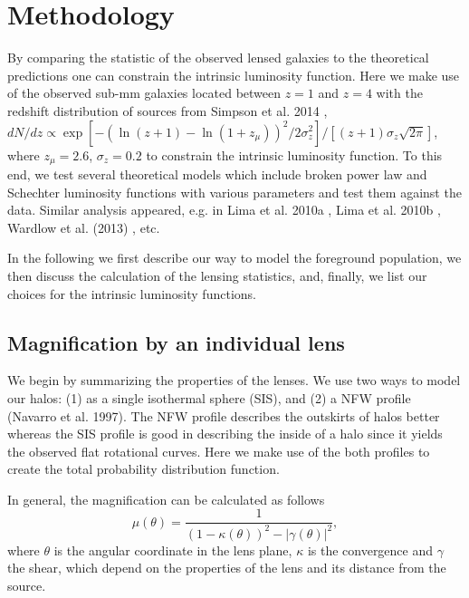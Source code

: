 \documentclass[12pt]{article}
\begin{document}
 
\section{Methodology}
By comparing the statistic of the observed lensed galaxies to the theoretical
predictions one can constrain the intrinsic luminosity function. Here we make
use of the observed sub-mm galaxies  located between $z = 1$ and $z = 4$ with
the  redshift distribution of sources from Simpson et al. 2014 \cite{Simpson:2014lr}, $
dN/dz \propto \exp\left[-(\ln(z+1)-\ln(1+z_\mu))^2/2\sigma_z^2\right]/\left[(z+1)\sigma_z\sqrt{2\pi}\right]$, where $z_\mu = 2.6$, $\sigma_z = 0.2$ to constrain the intrinsic luminosity function. To this end, we test several theoretical models which include broken power law and Schechter luminosity functions with various parameters and test them against the data. Similar analysis appeared, e.g.  in  Lima et al. 2010a \cite{Lima:2010a}, Lima et al. 2010b \cite{Lima:2010b}, Wardlow et al. (2013) \cite{Wardlow:2013}, etc. 


 In the following we first describe our way to model the foreground population, we then discuss the calculation of the lensing statistics, and, finally, we list our choices for the intrinsic luminosity functions. 


\subsection{Magnification by an individual lens}

We begin by summarizing the properties of the lenses. We use two ways to model our halos: (1) as a single isothermal sphere (SIS), and (2) a NFW profile (Navarro et al. 1997).  The NFW profile describes the outskirts of halos better whereas the SIS profile is good in describing the inside of a halo since it yields the  observed flat rotational curves. Here we make use of the both profiles to create the total probability distribution function.

In general, the magnification can be calculated as follows 
\begin{equation}
\mu(\theta) = \frac{1}{(1-\kappa(\theta))^2-|\gamma(\theta)|^2},
\end{equation}
where  $\theta$ is the angular  coordinate in the lens plane, $\kappa$ is the convergence and $\gamma $ the shear, which depend on the properties of the lens and its distance from the source.  
\end{document}
